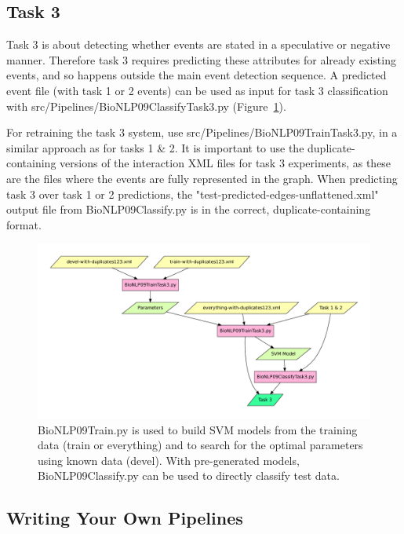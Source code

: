 \documentclass[a4paper,12pt]{article}
\begin{document}
\subsection{Task 3}

Task 3 is about detecting whether events are stated in a speculative or
negative manner. Therefore task 3 requires predicting these attributes for
already existing events, and so happens outside the main event detection
sequence. A predicted event file (with task 1 or 2 events) can be used as input
for task 3 classification with src/Pipelines/BioNLP09ClassifyTask3.py
(Figure~\ref{fig-programs3}). 

For retraining the task 3 system, use src/Pipelines/BioNLP09TrainTask3.py, in a
similar approach as for tasks 1 \& 2. It is important to use the
duplicate-containing versions of the interaction XML files for task 3
experiments, as these are the files where the events are fully represented in the
graph. When predicting task 3 over task 1 or 2 predictions, the
"test-predicted-edges-unflattened.xml" output file from BioNLP09Classify.py is in
the correct, duplicate-containing format.

\begin{figure}[htb]
\begin{center}
\includegraphics[scale=0.4]{Figures/programs3.pdf}
\end{center}
\caption{BioNLP09Train.py is used to build SVM models from the training data
(train or everything) and to search for the optimal parameters using known data
(devel). With pre-generated models, BioNLP09Classify.py can be used to directly
classify test data.}
\label{fig-programs3}
\end{figure}

\subsection{Writing Your Own Pipelines}
\end{document}
